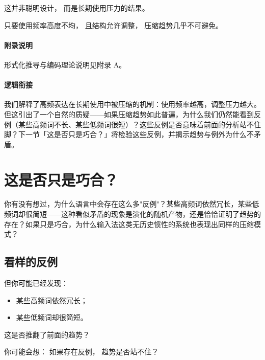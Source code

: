 \documentclass[openany, a4paper, 12pt]{book}
\begin{document}
这并非聪明设计，
而是长期使用压力的结果。

\begin{readingnote}
	只要使用频率高度不均，
	且结构允许调整，
	压缩趋势几乎不可避免。
\end{readingnote}

\paragraph{附录说明}
形式化推导与编码理论说明见附录 A。

\paragraph*{逻辑衔接}
我们解释了高频表达在长期使用中被压缩的机制：使用频率越高，调整压力越大。但这引出了一个自然的质疑——如果压缩趋势如此普遍，为什么我们仍然能看到反例（某些高频词不长、某些低频词很短）？这些反例是否意味着前面的分析站不住脚？下一节「这是否只是巧合？」将检验这些反例，并揭示趋势与例外为什么不矛盾。


\section{这是否只是巧合？}

\begin{questionbox}
	你有没有想过，为什么语言中会存在这么多"反例"？某些高频词依然冗长，某些低频词却很简短——这种看似矛盾的现象是演化的随机产物，还是恰恰证明了趋势的存在？如果只是巧合，为什么输入法这类无历史惯性的系统也表现出同样的压缩模式？
\end{questionbox}

\subsection{看样的反例}

但你可能已经发现：

\begin{itemize}
	\item 某些高频词依然冗长；
	\item 某些低频词却很简短。
\end{itemize}

这是否推翻了前面的趋势？

\begin{tcolorbox}[colback=yellow!5,title=\textit{读者行为预测}]
	你可能会想：
	如果存在反例，
	趋势是否站不住？
\end{tcolorbox}
\end{document}
